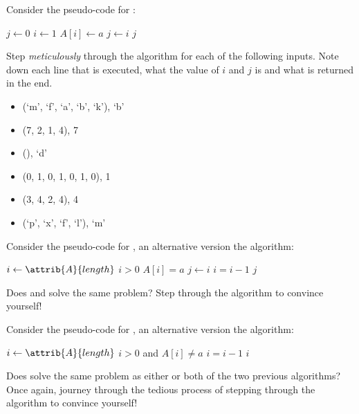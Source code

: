 \documentclass{article}
\begin{document}
\thispagestyle{fancy}

\begin{Exercise}
    \noindent
    Consider the pseudo-code for :

    \begin{codebox}
        \li $j \gets 0$
        \li \For $i \gets 1$ \To {} \Do
            \li \If $A[i] \gets a$ \Then
                \li $j \gets i$
            \End
        \End
        \li \Return $j$
    \end{codebox}

    \Question
    Step \textit{meticulously} through the algorithm for each of the following
    inputs. Note down each line that is executed, what the value of $i$ and $j$
    is and what is returned in the end.

    \begin{itemize}
        \item (`m', `f', `a', `b', `k'), `b'
        \item (7, 2, 1, 4), 7
        \item (), `d'
        \item (0, 1, 0, 1, 0, 1, 0), 1
        \item (3, 4, 2, 4), 4
        \item (`p', `x', `f', `l'), `m'
    \end{itemize}

    \medskip
    \ExeText
    Consider the pseudo-code for , an alternative version
    the algorithm:
    
    \begin{codebox}
        \li $i \gets \attrib{A}{length}$
        \li \While $i > 0$ \Do
            \li \If $A[i] = a$ \Then
                \li $j \gets i$
            \End
            \li $i = i - 1$
        \End
        \li \Return $j$
    \end{codebox}

    \Question
    Does  and  solve the same problem?
    Step through the algorithm to convince yourself!

    \medskip
    \ExeText
    Consider the pseudo-code for , an alternative version
    the algorithm:
    
    \begin{codebox}
        \li $i \gets \attrib{A}{length}$
        \li \While $i > 0$ and $A[i] \neq a$ \Then
            \li $i = i - 1$
        \End
        \li \Return $i$
    \end{codebox}

    \Question
    Does  solve the same problem as either or both of the
    two previous algorithms? Once again, journey through the tedious process of
    stepping through the algorithm to convince yourself!

\end{Exercise}
    
\end{document}
